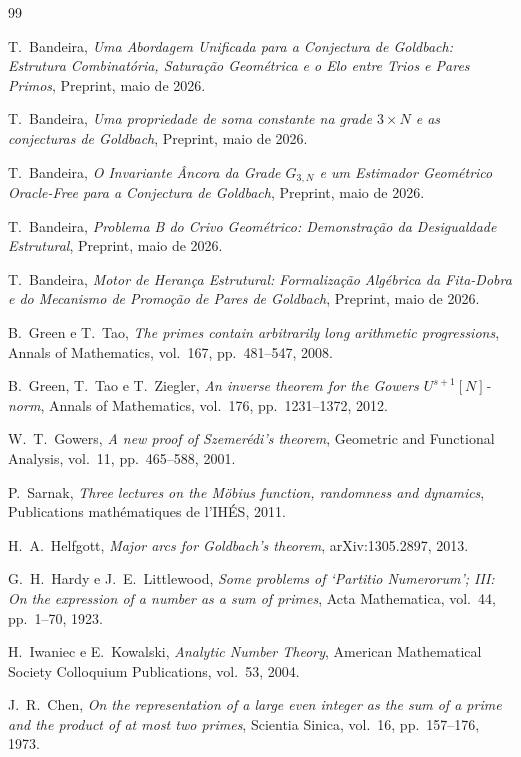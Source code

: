 \documentclass[12pt,a4paper]{article}
\theoremstyle{definition}
\begin{document}
	\begin{thebibliography}{99}
		
		T.~Bandeira,
		\textit{Uma Abordagem Unificada para a Conjectura de Goldbach: Estrutura
			Combinatória, Saturação Geométrica e o Elo entre Trios e Pares Primos},
		Preprint, maio de 2026.
		
		T.~Bandeira,
		\textit{Uma propriedade de soma constante na grade $3 \times N$ e as
			conjecturas de Goldbach},
		Preprint, maio de 2026.
		
		T.~Bandeira,
		\textit{O Invariante Âncora da Grade $G_{3,N}$ e um Estimador Geométrico
			Oracle-Free para a Conjectura de Goldbach},
		Preprint, maio de 2026.
		
		T.~Bandeira,
		\textit{Problema B do Crivo Geométrico: Demonstração da Desigualdade
			Estrutural},
		Preprint, maio de 2026.
		
		T.~Bandeira,
		\textit{Motor de Herança Estrutural: Formalização Algébrica da Fita-Dobra
			e do Mecanismo de Promoção de Pares de Goldbach},
		Preprint, maio de 2026.
		
		B.~Green e T.~Tao,
		\textit{The primes contain arbitrarily long arithmetic progressions},
		Annals of Mathematics, vol.~167, pp.~481--547, 2008.
		
		B.~Green, T.~Tao e T.~Ziegler,
		\textit{An inverse theorem for the Gowers $U^{s+1}[N]$-norm},
		Annals of Mathematics, vol.~176, pp.~1231--1372, 2012.
		
		W.~T.~Gowers,
		\textit{A new proof of Szemerédi's theorem},
		Geometric and Functional Analysis, vol.~11, pp.~465--588, 2001.
		
		P.~Sarnak,
		\textit{Three lectures on the Möbius function, randomness and dynamics},
		Publications mathématiques de l'IHÉS, 2011.
		
		H.~A.~Helfgott,
		\textit{Major arcs for Goldbach's theorem},
		arXiv:1305.2897, 2013.
		
		G.~H.~Hardy e J.~E.~Littlewood,
		\textit{Some problems of `Partitio Numerorum'; III: On the expression of a
			number as a sum of primes},
		Acta Mathematica, vol.~44, pp.~1--70, 1923.
		
		H.~Iwaniec e E.~Kowalski,
		\textit{Analytic Number Theory},
		American Mathematical Society Colloquium Publications, vol.~53, 2004.
		
		J.~R.~Chen,
		\textit{On the representation of a large even integer as the sum of a prime
			and the product of at most two primes},
		Scientia Sinica, vol.~16, pp.~157--176, 1973.
		
	\end{thebibliography}
	
\end{document}
